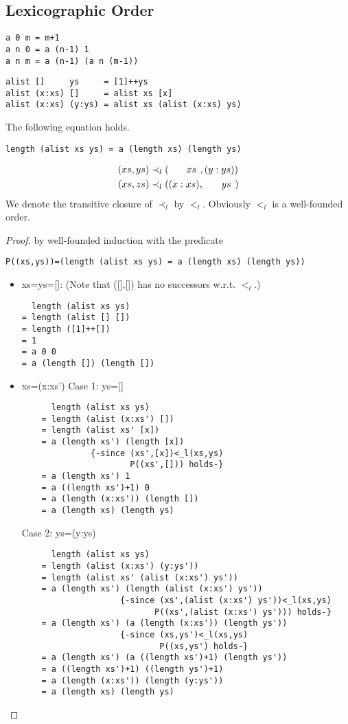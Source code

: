 \subsection{Lexicographic Order}
\begin{verbatim}
a 0 m = m+1
a n 0 = a (n-1) 1
a n m = a (n-1) (a n (m-1))
\end{verbatim}
\begin{verbatim}
alist []     ys     = [1]++ys
alist (x:xs) []     = alist xs [x]
alist (x:xs) (y:ys) = alist xs (alist (x:xs) ys)
\end{verbatim}
\begin{claim}The following equation holds.
\begin{verbatim}
length (alist xs ys) = a (length xs) (length ys)
\end{verbatim}
\end{claim}
\begin{align*}
(xs,ys)&\prec_l(\hphantom{(x:\ }xs\hphantom{)},(y:ys))\\
(xs,zs)&\prec_l((x:xs),\hphantom{(x:\ }ys\hphantom{)})
\end{align*}
We denote the transitive closure of $\prec_l$ by $<_l$. Obviously $<_l$ is a well-founded order.
\begin{proof} by well-founded induction with the predicate 
\begin{verbatim}
P((xs,ys))=(length (alist xs ys) = a (length xs) (length ys))
\end{verbatim}
\begin{itemize}
\item[] xs=ys=[]: (Note that ([],[]) has no successors w.r.t. $<_l$.)
\begin{verbatim}
  length (alist xs ys)
= length (alist [] [])
= length ([1]++[])
= 1
= a 0 0
= a (length []) (length [])
\end{verbatim}
\item[] xs=(x:xs')
\subitem Case 1: ys=[]
\begin{verbatim}
	  length (alist xs ys)
	= length (alist (x:xs') []) 
	= length (alist xs' [x])
	= a (length xs') (length [x]) 
              {-since (xs',[x])<_l(xs,ys) 
                      P((xs',[])) holds-}
	= a (length xs') 1
	= a ((length xs')+1) 0
	= a (length (x:xs')) (length [])
	= a (length xs) (length ys)
\end{verbatim}
\subitem Case 2: ys=(y:ys)
\begin{verbatim}
	  length (alist xs ys)
	= length (alist (x:xs') (y:ys')) 
	= length (alist xs' (alist (x:xs') ys'))
	= a (length xs') (length (alist (x:xs') ys')) 
	                {-since (xs',(alist (x:xs') ys'))<_l(xs,ys) 
	                       P((xs',(alist (x:xs') ys'))) holds-}
	= a (length xs') (a (length (x:xs')) (length ys'))
	                {-since (xs,ys')<_l(xs,ys) 
	                        P((xs,ys') holds-}
	= a (length xs') (a ((length xs')+1) (length ys'))
	= a ((length xs')+1) ((length ys')+1)
	= a (length (x:xs')) (length (y:ys'))
	= a (length xs) (length ys)
\end{verbatim}
\end{itemize}
\end{proof}
